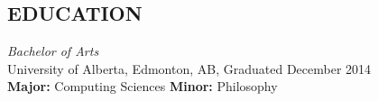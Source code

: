 \documentclass[margin, 9pt]{res} %
\begin{document}
\begin{resume}

\section{EDUCATION}

{\sl Bachelor of Arts}\\
University of Alberta, Edmonton, AB, Graduated December 2014 \\
{\bf Major:} Computing Sciences {\bf Minor:} Philosophy

\end{resume}
\end{document}
